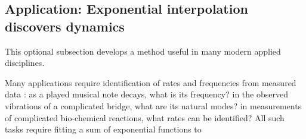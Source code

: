










\subsection{Application: Exponential interpolation discovers dynamics}
\label{sec:eidd}


This optional subsection develops a method useful in many modern applied disciplines.

Many applications require identification of rates and frequencies from measured data \cite[e.g.,][]{Pereyra2010}:
as a played musical note decays, what is its frequency?
in the observed vibrations of a complicated bridge, what are its natural modes?
in measurements of complicated bio-chemical reactions, what rates can be identified?
All such tasks require fitting a sum of exponential functions to 



